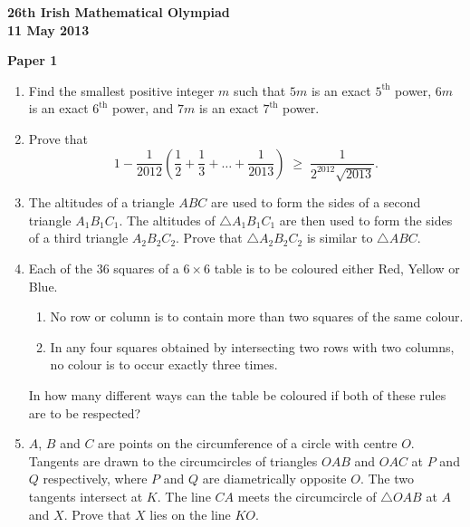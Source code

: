 \documentclass[12pt]{article}
\begin{document}
\begin{center}
{\large\bfseries 26th Irish Mathematical Olympiad\\11 May 2013}
\end{center}
\bigskip\noindent\textbf{Paper 1}\bigskip
\begin{enumerate}
\item Find the smallest positive integer $m$ such that $5m$ is an exact $5^{\text{th}}$ power, $6m$ is an exact $6^{\text{th}}$ power, and $7m$ is an exact $7^{\text{th}}$ power.

\item Prove that
\[
1 - \frac{1}{2012}\left(\frac{1}{2} + \frac{1}{3} + \ldots + \frac{1}{2013}\right) \;\geq\; \frac{1}{2^{2012}\sqrt{2013}}.
\]

\item The altitudes of a triangle $ABC$ are used to form the sides of a second triangle $A_1B_1C_1$. The altitudes of $\triangle A_1B_1C_1$ are then used to form the sides of a third triangle $A_2B_2C_2$. Prove that $\triangle A_2B_2C_2$ is similar to $\triangle ABC$.

\item Each of the 36 squares of a $6 \times 6$ table is to be coloured either Red, Yellow or Blue.
\begin{enumerate}
\item[(a)] No row or column is to contain more than two squares of the same colour.
\item[(b)] In any four squares obtained by intersecting two rows with two columns, no colour is to occur exactly three times.
\end{enumerate}
In how many different ways can the table be coloured if both of these rules are to be respected?

\item $A$, $B$ and $C$ are points on the circumference of a circle with centre $O$. Tangents are drawn to the circumcircles of triangles $OAB$ and $OAC$ at $P$ and $Q$ respectively, where $P$ and $Q$ are diametrically opposite $O$. The two tangents intersect at $K$. The line $CA$ meets the circumcircle of $\triangle OAB$ at $A$ and $X$. Prove that $X$ lies on the line $KO$.
\end{enumerate}
\end{document}
